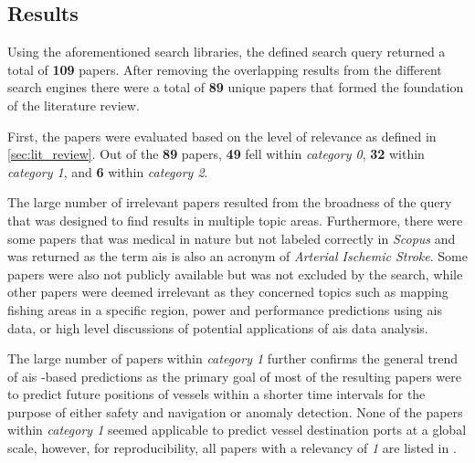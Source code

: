 \subsection{Results}

Using the aforementioned search libraries, the defined search query returned a total of \textbf{109} papers. After removing the overlapping results from the different search engines there were a total of \textbf{89} unique papers that formed the foundation of the literature review.

First, the papers were evaluated based on the level of relevance as defined in \cref{sec:lit_review}. Out of the \textbf{89} papers, \textbf{49} fell within \textit{category 0}, \textbf{32} within \textit{category 1}, and \textbf{6} within \textit{category 2}.

The large number of irrelevant papers resulted from the broadness of the query that was designed to find results in multiple topic areas. Furthermore, there were some papers that was medical in nature but not labeled correctly in \textit{Scopus} and was returned as the term \acrshort{ais} is also an acronym of \textit{Arterial Ischemic Stroke}. Some papers were also not publicly available but was not excluded by the search, while other papers were deemed irrelevant as they concerned topics such as mapping fishing areas in a specific region, power and performance predictions using \acrshort{ais} data, or high level discussions of potential applications of \acrshort{ais} data analysis.

The large number of papers within \textit{category 1} further confirms the general trend of \acrshort{ais} -based predictions as the primary goal of most of the resulting papers were to predict future positions of vessels within a shorter time intervals for the purpose of either safety and navigation or anomaly detection. None of the papers within \textit{category 1} seemed applicable to predict vessel destination ports at a global scale, however, for reproducibility, all papers with a relevancy of \textit{1} are listed in .

